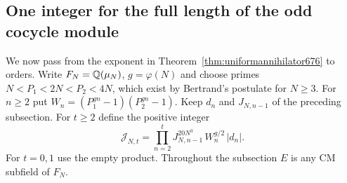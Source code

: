 \documentclass[a4paper,11pt]{article}
\theoremstyle{definition}
\theoremstyle{remark}
\numberwithin{equation}{section}
\begin{document}
\subsection{One integer for the full length of the odd cocycle module}
\label{sec:oddlengthinteger677}

We now pass from the exponent in
Theorem~\ref{thm:uniformannihilator676} to orders. Write
\(F_N=\mathbb Q(\mu_N)\), \(g=\varphi(N)\) and choose primes
\(N<P_1<2N<P_2<4N\), which exist by Bertrand's postulate for
\(N\ge3\). For \(n\ge2\) put
\(W_n=(P_1^{gn}-1)(P_2^{gn}-1)\).
Keep \(d_n\) and \(J_{N,n-1}\) of the preceding subsection.
For \(t\ge2\) define the positive integer
\[
 \mathcal J_{N,t}=
   \prod_{n=2}^{t}J_{N,n-1}^{20N^3}\,W_n^{g/2}\,|d_n| .
\]
For \(t=0,1\) use the empty product. Throughout the subsection
\(E\) is any CM subfield of \(F_N\).
\end{document}
